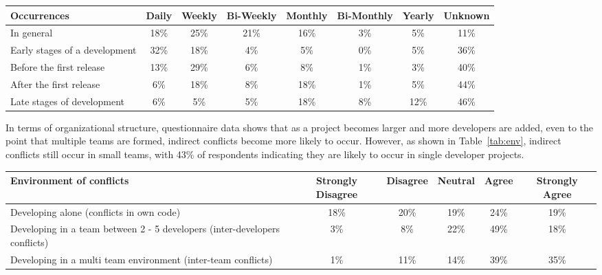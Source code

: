\documentclass[conference]{IEEEtran}
\begin{document}
\begin{table*}[tb!]
\begin{center}
\begin{tabular}{| p{7cm} | c | c | c | c | c | c | c |}
\hline
Occurrences & Daily & Weekly & Bi-Weekly & Monthly & Bi-Monthly & Yearly & Unknown \\
\hline
\hline
In general & 18\% & 25\% & 21\% & 16\% & 3\% & 5\% & 11\% \\ \hline
Early stages of a development & 32\% & 18\% & 4\% & 5\% & 0\% & 5\% & 36\% \\ \hline
Before the first release & 13\% & 29\% & 6\% & 8\% & 1\% & 3\% & 40\% \\ \hline
After the first release & 6\% & 18\% & 8\% & 18\% & 1\% & 5\% & 44\% \\ \hline
Late stages of development & 6\% & 5\% & 5\% & 18\% & 8\% & 12\% & 46\% \\ \hline
\end{tabular}
\end{center}
\caption{Results of questionnaire as to how often indirect conflicts occur, in terms of percentage
of questionnaire participants.\label{tab:often}}
\end{table*}

In terms of organizational structure, questionnaire data shows that as a project becomes larger and more
developers are added, even to the point that multiple teams are formed, indirect conflicts become more likely to
occur. However, as shown in Table~\ref{tab:env}, indirect conflicts still occur in small teams, with  43\% of respondents indicating
 they are likely to occur in single developer projects.

\begin{table*}[tb!]
\begin{center}
\begin{tabular}{| p{7cm} | c | c | c | c | c |}
\hline
Environment of conflicts & Strongly Disagree & Disagree & Neutral & Agree & Strongly Agree \\
\hline
\hline
Developing alone (conflicts in own code) & 18\% & 20\% & 19\% & 24\% & 19\% \\ \hline
Developing in a team between 2 - 5 developers (inter-developers conflicts) & 3\% & 8\% & 22\% & 49\% & 18\% \\ \hline
Developing in a multi team environment (inter-team conflicts) & 1\% & 11\% & 14\% & 39\% & 35\% \\ \hline
\end{tabular}
\end{center}
\caption{Questionnaire results about development environments in which indirect conflicts are likely to occur, in terms of percentage
of questionnaire participants.\label{tab:env}}
\end{table*}
\end{document}
